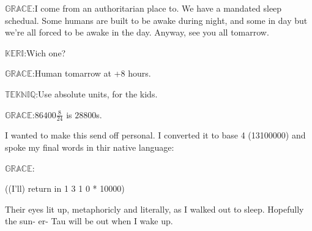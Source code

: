 \documentclass{article}
\newcommand{\gr}{\noindent$\mathbb{GRACE}$:}
\newcommand{\tek}{\noindent$\mathbb{TEKNIQ}$:}
\newcommand{\kem}{\noindent$\mathbb{KERI}$:}
\begin{document}
\gr I come from an authoritarian place to. We have a mandated sleep schedual. Some humans are built to be awake during night, and some in day but we're all forced to be awake in the day. Anyway, see you all tomarrow.

\kem Wich one?

\gr Human tomarrow at +8 hours.

\tek Use absolute units, for the kids.

\gr $86400\frac{8}{24}$ is $28800$s.

I wanted to make this send off personal. I converted it to base 4 (13100000) and spoke my final words in thir native language:

\gr {}

((I'll) return in 1 3 1 0 * 10000)

Their eyes lit up, metaphoricly and literally, as I walked out to sleep. Hopefully the sun- er- Tau will be out when I wake up.

\end{document}
